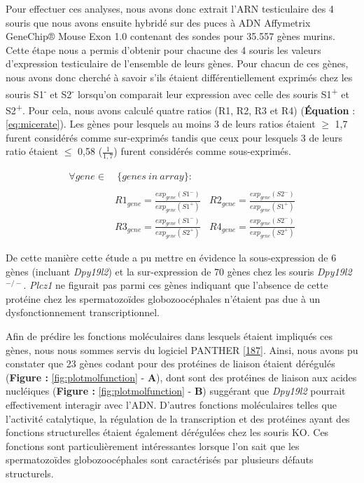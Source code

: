 \documentclass[12pt,a4paper,twoside]{ugathesis}
\theoremstyle{definition}
\theoremstyle{definition}
\theoremstyle{definition}
\theoremstyle{remark}
\begin{document}
Pour effectuer ces analyses, nous avons donc extrait l'ARN testiculaire
des 4 souris que nous avons ensuite hybridé sur des puces à ADN
Affymetrix GeneChip® Mouse Exon 1.0 contenant des sondes pour 35.557
gènes murins. Cette étape nous a permis d'obtenir pour chacune des 4
souris les valeurs d'expression testiculaire de l'ensemble de leurs
gènes. Pour chacun de ces gènes, nous avons donc cherché à savoir s'ils
étaient différentiellement exprimés chez les souris
S1\textsuperscript{-} et S2\textsuperscript{-} lorsqu'on comparait leur
expression avec celle des souris S1\textsuperscript{+} et
S2\textsuperscript{+}. Pour cela, nous avons calculé quatre ratios (R1,
R2, R3 et R4) (\textbf{Équation} : \eqref{eq:micerate}). Les gènes pour
lesquels au moins 3 de leurs ratios étaient \(\ge\) 1,7 furent
considérés comme sur-exprimés tandis que ceux pour lesquels 3 de leurs
ratio étaient \(\le\) 0,58 (\(\frac{1}{1,7}\)) furent considérés comme
sous-exprimés.

\begin{equation} 
\begin{split}
\forall gene \in & \ \{genes\ in\ array\}: \\
\\
& R1_{gene} = \frac{exp_{gene}(S1^-)}{exp_{gene}(S1^+)} \ \ \ \ R2_{gene} = \frac{exp_{gene}(S2^-)}{exp_{gene}(S1^+)} \\
& R3_{gene} = \frac{exp_{gene}(S1^-)}{exp_{gene}(S2^+)} \ \ \ \ R4_{gene} = \frac{exp_{gene}(S2^-)}{exp_{gene}(S2^+)} 
\label{eq:micerate}
\end{split}
\end{equation}

De cette manière cette étude a pu mettre en évidence la sous-expression
de 6 gènes (incluant \emph{Dpy19l2}) et la sur-expression de 70 gènes
chez les souris \emph{Dpy19l2}\(^{-/-}\). \emph{Plcz1} ne figurait pas
parmi ces gènes indiquant que l'absence de cette protéine chez les
spermatozoïdes globozoocéphales n'étaient pas due à un dysfonctionnement
transcriptionnel.

Afin de prédire les fonctions moléculaires dans lesquels étaient
impliqués ces gènes, nous nous sommes servis du logiciel PANTHER
{[}\protect\hyperlink{ref-Mi2017}{187}{]}. Ainsi, nous avons pu
constater que 23 gènes codant pour des protéines de liaison étaient
dérégulés (\textbf{Figure : }\ref{fig:plotmolfunction} - \textbf{A}),
dont sont des protéines de liaison aux acides nucléiques (\textbf{Figure
: }\ref{fig:plotmolfunction} - \textbf{B}) suggérant que \emph{Dpy19l2}
pourrait effectivement interagir avec l'ADN. D'autres fonctions
moléculaires telles que l'activité catalytique, la régulation de la
transcription et des protéines ayant des fonctions structurelles étaient
également dérégulées chez les souris KO. Ces fonctions sont
particulièrement intéressantes lorsque l'on sait que les spermatozoïdes
globozoocéphales sont caractérisés par plusieurs défauts structurels.
\end{document}
